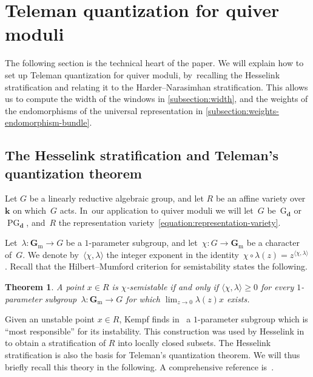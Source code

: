 \documentclass[JEP,XML,SOM,Unicode,NoEqCountersInSection,published]{cedram}
\theoremstyle{plain}
\newtheorem{theorem}{Theorem}[section]
\theoremstyle{definition}
\DeclareMathOperator\PG{PG}
\newcommand\field{\mathbf{k}}
\newcommand\Gm{\ensuremath{\mathbf{G}_{\mathrm{m}}}}
\newcommand\group[1][\tuple{d}]{\mathrm{G}_{#1}}
\newcommand\tuple[1]{\ensuremath{{\boldsymbol{#1}}}}
\begin{document}
\section{Teleman quantization for quiver moduli}
\label{section:teleman-for-quiver-moduli}
The following section is the technical heart of the paper.
We will explain how to set up Teleman quantization for quiver moduli, by~recalling the Hesselink stratification
and relating it to the Harder--Narasimhan stratification.
This allows us to compute the width of the windows in \cref{subsection:width},
and the weights of the endomorphisms of the universal representation in \cref{subsection:weights-endomorphism-bundle}.

\subsection{The Hesselink stratification and Teleman's quantization theorem}
\label{subsection:hesselink-and-teleman}
Let $G$ be a linearly reductive algebraic group,
and let $R$ be an affine variety over $\field$ on which~$G$ acts. In~our application to quiver moduli we will let~$G$ be~$\group$ or~$\PG_{\tuple{d}}$,
and~$R$ the representation variety~\eqref{equation:representation-variety}.

Let~$\lambda\colon\Gm\to G$ be a $1$-parameter subgroup,
and let~$\chi\colon G \to \Gm$ be a character of~$G$.
We denote by~$\langle\chi,\lambda\rangle$ the integer exponent in the identity~$\chi \circ \lambda (z) = z^{\langle\chi,\lambda\rangle}$.
Recall that the Hilbert--Mumford criterion for semistability states the following.

\begin{theorem}
\label{theorem:hilbert-mumford}
A point $x \in R$ is $\chi$-semistable if and only if $ \langle\chi,\lambda\rangle \geq 0$
for every $1$-parameter subgroup~$\lambda\colon \Gm \to G$
for which $\lim_{z \to 0} \lambda(z)x$ exists.
\end{theorem}
Given an unstable point $x \in R$, Kempf finds in~\cite{MR0506989} a $1$-parameter subgroup which is
``most responsible'' for its instability.
This construction was used by Hesselink in~\cite{MR0514673}
to obtain a stratification of $R$ into locally closed subsets.
The Hesselink stratification is also the basis for Teleman's quantization theorem.
We will thus briefly recall this theory in the following.
A comprehensive reference is~\cite[\S 12 \& \S 13]{MR0766741}.
\end{document}
